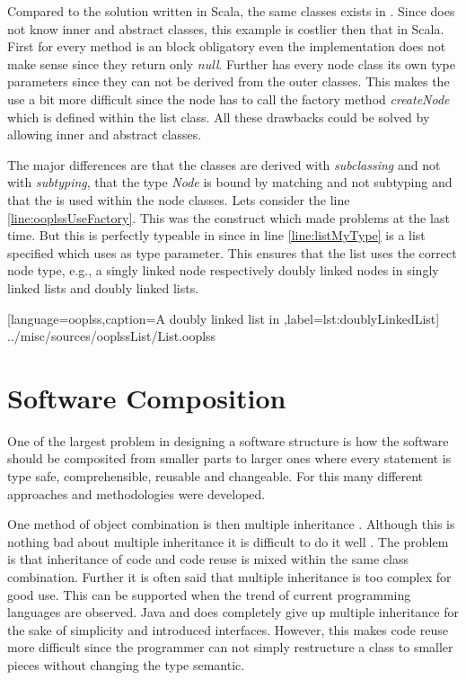 Compared to the solution written in Scala, the same classes exists
in \ooplss. Since \ooplss does not know inner and abstract classes,
this example is costlier then that in Scala. First for every method is
an block obligatory even the implementation does not make sense since
they return only \emph{null}. Further has every node class its own type
parameters since they can not be derived from the outer classes. This
makes the use a bit more difficult since the node has to call the factory
method \emph{createNode} which is defined within the list class. All
these drawbacks could be solved by allowing inner and abstract classes.

The major differences are that the classes are derived with
\emph{subclassing} and not with \emph{subtyping}, that the type
\emph{Node} is bound by matching and not subtyping and that the
\mytype is used within the node classes. Lets consider the line
\ref{line:ooplssUseFactory}. This was the construct which made problems
at the last time. But this is perfectly typeable in \ooplss since in
line \ref{line:listMyType} is a list specified which uses \mytype as
type parameter. This ensures that the list uses the correct node type,
e.g., a singly linked node respectively doubly linked nodes in singly
linked lists and doubly linked lists.


[language=ooplss,caption=A doubly linked list in \ooplss,label=lst:doublyLinkedList]
{../misc/sources/ooplssList/List.ooplss}

\section{Software Composition}
One of the largest problem in designing a software structure is how the
software should be composited from smaller parts to larger ones where every
statement is type safe, comprehensible, reusable and changeable. For this
many different approaches and methodologies were developed.

One method of object combination is then multiple inheritance
\cite{taivalsaari_notion_1996}. Although this is nothing
bad about multiple inheritance it is difficult to do it well
\cite{wegner_panel_1987}. The problem is that inheritance of code
and code reuse is mixed within the same class combination. Further
it is often said that multiple inheritance is too complex for good use.
This can be supported when the trend of current programming languages are
observed. Java and \cs does completely give up multiple inheritance for
the sake of simplicity and introduced interfaces. However, this makes
code reuse more difficult since the programmer can not simply restructure
a class to smaller pieces without changing the type semantic.

